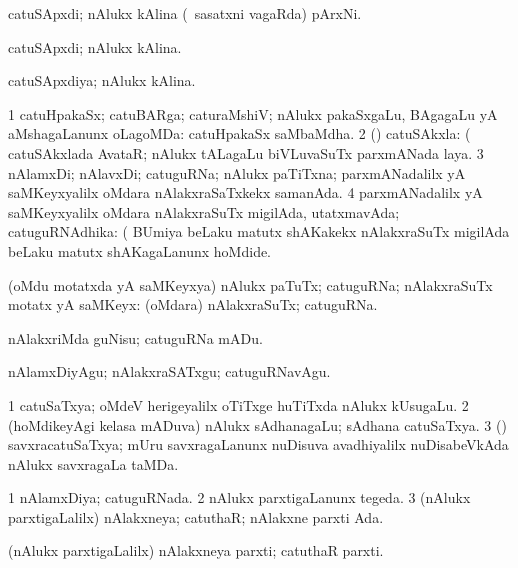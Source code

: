 \bentry
{}
\gl{\nA}
\bmng
catuSApxdi; nAlukx kAlina (\kanmu\ sasatxni vagaRda) pArxNi. 
\emng
\eentry

\bentry
{}
\gl{\gu}
\bmng
catuSApxdi; nAlukx kAlina. 
\emng
\eentry

\bentry
{}
\gl{\gu}
\bmng
catuSApxdiya; nAlukx kAlina. 
\emng
\eentry

\bentry
{}
\gl{\gu}
\bmng
\bnum
\num{1} catuHpakaSx; catuBARga; caturaMshiV; nAlukx pakaSxgaLu, BAgagaLu yA aMshagaLanunx oLagoMDa:  catuHpakaSx saMbaMdha. 
\num{2} (\saM) catuSAkxla:  (  catuSAkxlada AvataR; nAlukx tALagaLu biVLuvaSuTx parxmANada laya. 
\num{3} nAlamxDi; nAlavxDi; catuguRNa; nAlukx paTiTxna; parxmANadalilx yA saMKeyxyalilx oMdara nAlakxraSaTxkekx samanAda. 
\num{4} parxmANadalilx yA saMKeyxyalilx oMdara nAlakxraSuTx migilAda, utatxmavAda; catuguRNA\-dhika:  (  BUmiya beLaku matutx shAKakekx nAlakxraSuTx migilAda beLaku matutx shAKagaLanunx hoMdide. 
\enum
\emng
\eentry


\bentry
{}
\gl{\nA}
\bmng
(oMdu motatxda yA saMKeyxya) nAlukx paTuTx; catuguRNa; nAlakxraSuTx motatx yA saMKeyx:  (oMdara) nAlakxraSuTx; catuguRNa. 
\emng
\eentry


\bentry
{}
\gl{\sakirx}
\bmng
nAlakxriMda guNisu; catuguRNa mADu. 
\emng

\noindent
\gl{\akirx}
\bmng
nAlamxDiyAgu; nAlakxraSATxgu; catuguRNavAgu. 
\emng
\eentry


\bentry
{}
\gl{\nA}
\bmng
\bnum
\num{1} catuSaTxya; oMdeV herigeyalilx oTiTxge huTiTxda nAlukx kUsugaLu. 
\num{2} (hoMdikeyAgi kelasa mADuva) nAlukx sAdhanagaLu; sAdhana catuSaTxya. 
\num{3} (\saM) savxracatuSaTxya; mUru savxragaLanunx nuDisuva avadhiyalilx nuDisabeVkAda nAlukx savxragaLa taMDa. 
\enum
\emng
\eentry


\bentry
{}
\gl{\gu}
\bmng
\bnum
\num{1} nAlamxDiya; catuguRNada. 
\num{2} nAlukx parxtigaLanunx tegeda. 
\num{3} (nAlukx parxtigaLalilx) nAlakxneya; catuthaR; nAlakxne parxti Ada. 
\enum
\emng
\eentry


\bentry
{}
\gl{\nA}
\bmng
(nAlukx parxtigaLalilx) nAlakxneya parxti; catuthaR parxti. 
\emng

